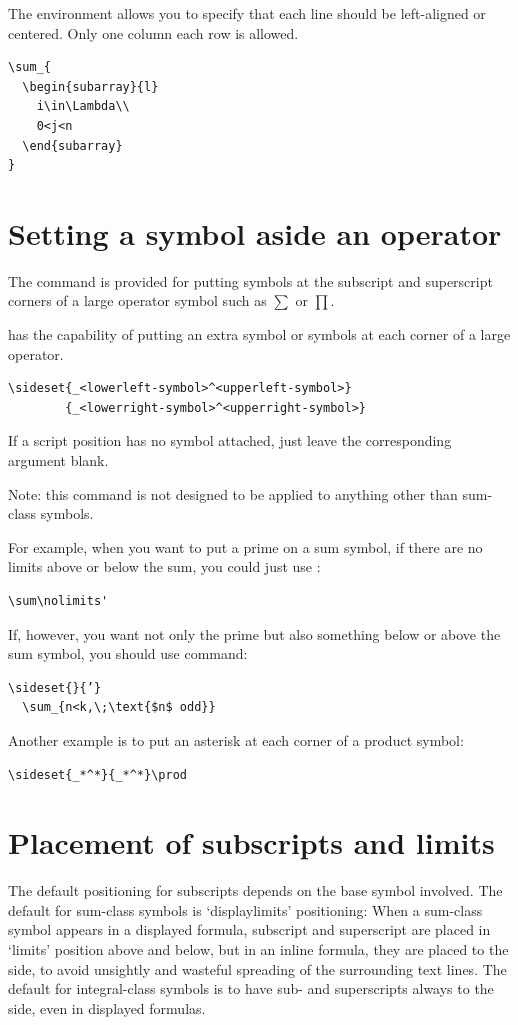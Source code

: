 \documentclass[a4paper,oneside]{book}
\newcommand{\sq}[1]{`#1'}
\newcommand{\envir}[1]{\PVerb{#1}}
\newcommand{\command}[1]{\PVerb{#1}}
\begin{document}
The \envir{subarray} environment allows you to specify that each line should be left-aligned or centered. Only one column each row is allowed.
\begin{lstlisting}[deletecomment={[s]{<}{>}},backgroundcolor=\color{Lavender},frame=single,rulecolor=\color{LightGrey}]
\sum_{
  \begin{subarray}{l}
    i\in\Lambda\\
    0<j<n
  \end{subarray}
}
\end{lstlisting}

\section{Setting a symbol aside an operator}
The \command{\sideset} command is provided for putting symbols at the subscript and superscript corners of a large operator symbol such as $\sum$ or $\prod$. 

\command{\sideset} has the capability of putting an extra symbol or symbols at each corner of a large operator.
\begin{lstlisting}[columns=fixed,deletecomment={[s]{<}{>}}]
\sideset{_<lowerleft-symbol>^<upperleft-symbol>}
        {_<lowerright-symbol>^<upperright-symbol>}
\end{lstlisting}
If a script position has no symbol attached, just leave the corresponding argument blank.

Note: this command is not designed to be applied to anything other than sum-class symbols.

For example, when you want to put a prime on a sum symbol, if  there are no limits above or below the sum, you could just use \command{\nolimits}:
\begin{lstlisting}
\sum\nolimits'
\end{lstlisting}
If, however, you want not only the prime but also something below or above the sum symbol, you should use \command{\sideset} command:
\begin{lstlisting}
\sideset{}{’}
  \sum_{n<k,\;\text{$n$ odd}}
\end{lstlisting}

Another example is to  put an asterisk at each corner of a product symbol:
\begin{lstlisting}
\sideset{_*^*}{_*^*}\prod
\end{lstlisting}

\section{Placement of subscripts and limits}
The default positioning for subscripts depends on the base symbol involved. The default for sum-class symbols is \sq{displaylimits} positioning: When a sum-class symbol appears in a displayed formula, subscript and superscript are placed in \sq{limits} position above and below, but in an inline formula, they are placed to the side, to avoid unsightly and wasteful spreading of the surrounding text lines. The default for integral-class symbols is to have sub- and superscripts always to the side, even in displayed formulas.
\end{document}
